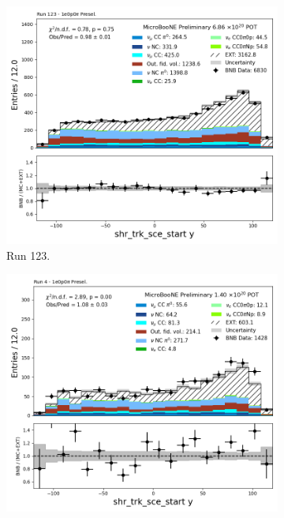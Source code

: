\begin{figure}[H]
    \centering
    \begin{subfigure}[t]{0.32\linewidth}
        \includegraphics[width=\linewidth]{technote/Appendix_Preselection/Figures/1e0p0pi/Run123/shr_trk_sce_start_y_Run123_1e0p0pi_Presel.png}
        \caption{Run 123.}
    \end{subfigure}%
    \hspace{0.2cm}%
    \begin{subfigure}[t]{0.32\linewidth}
        \includegraphics[width=\linewidth]{technote/Appendix_Preselection/Figures/1e0p0pi/Run4b/shr_trk_sce_start_y_Run4b_1e0p0pi_Presel.png}

\end{subfigure}
\end{figure}
